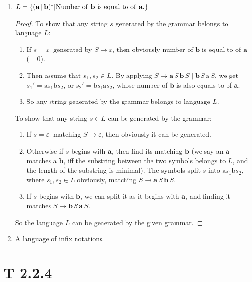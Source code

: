 \documentclass[scheme=plain,12pt]{ctexart}
\begin{document}
\begin{enumerate}
\begin{proof}
            So the given grammar generates language $L$.
        \end{proof}
        \item $L = \{(\mathbf{a}\,|\,\mathbf{b})^* | \text{Number of \textbf{b} is equal to of \textbf{a}.}\}$
        \begin{proof}
            To show that any string $s$ generated by the grammar belongs to language $L$:
            \begin{enumerate}
                \item If $s = \varepsilon$, generated by $S \to \varepsilon$, then obviously number of $\mathbf{b}$ is equal to of $\mathbf{a}$ (= 0).
                \item Then assume that $s_1, s_2 \in L$. By applying $S \to \mathbf{a}\,S\,\mathbf{b}\,S\;|\;\mathbf{b}\,S\,\mathrm{a}\,S$, we get $s_1' = \mathrm{a}s_1\mathrm{b}s_2$, or $s_2' = \mathrm{b}s_1\mathrm{a}s_2$, whose number of $\mathbf{b}$ is also equals to of $\mathbf{a}$.
                \item So any string generated by the grammar belongs to language $L$.
            \end{enumerate}
            To show that any string $s \in L$ can be generated by the grammar:
            \begin{enumerate}
                \item If $s = \varepsilon$, matching $S \to \varepsilon$, then obviously it can be generated.
                \item Otherwise if $s$ begins with $\mathbf{a}$, then find its matching $\mathbf{b}$ (we say an $\mathbf{a}$ matches a $\mathbf{b}$, iff the substring between the two symbols belongs to $L$, and the length of the substring is minimal). The symbols split $s$ into $\mathrm{a}s_1\mathrm{b}s_2$, where $s_1, s_2 \in L$ obviously, matching $S \to \mathbf{a}\,S\,\mathbf{b}\,S$.
                \item If $s$ begins with $\mathbf{b}$, we can split it as it begins with $\mathbf{a}$, and finding it matches $S \to \mathbf{b}\,S\,\mathbf{a}\,S$.
            \end{enumerate}
            So the language $L$ can be generated by the given grammar.
        \end{proof}
        \item A language of infix notations.
    \end{enumerate}

    \newpage
    \section{T 2.2.4}
\end{document}
